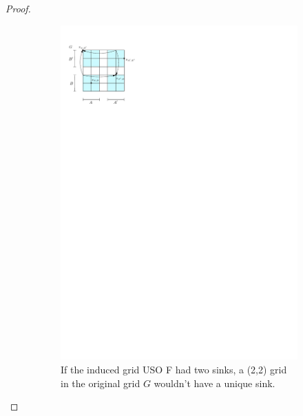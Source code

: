 \documentclass[runningheads,a4paper]{llncs}
\begin{document}
\begin{proof}
\begin{figure}
\begin{subfigure}[t]{0.45\textwidth}
\includegraphics{product_lemma_two_sinks.pdf}
\caption{\small If the induced grid USO F had two sinks, a (2,2) grid in the original grid $G$ wouldn't have a unique sink.}
\label{fig:InducedUSOtwosinks}
\end{subfigure}
\qquad\qquad
\begin{subfigure}[t]{0.45\textwidth}

\end{subfigure}
\end{figure}
\end{proof}
\end{document}
